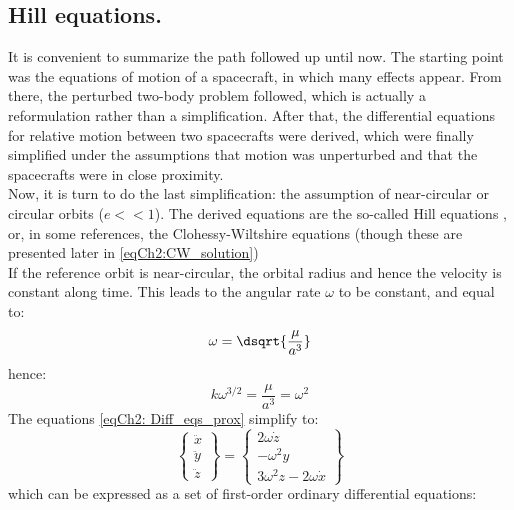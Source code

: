 	\subsection{Hill equations.}\label{secCh2:Hill_eqs}
	\indent It is convenient to summarize the path followed up until now. The starting point was the equations of motion of a spacecraft, in which many effects appear. From there, the perturbed two-body problem followed, which is actually a reformulation rather than a simplification. After that, the differential equations for relative motion between two spacecrafts were derived, which were finally simplified under the assumptions that motion was unperturbed and that the spacecrafts were in close proximity. \\
	\indent Now, it is turn to do the last simplification: the assumption of near-circular or circular orbits ($e<<1$). The derived equations are the so-called Hill equations \cite{Hill}, or, in some references, the Clohessy-Wiltshire equations (though these are presented later in \eqref{eqCh2:CW_solution})\\
	\indent If the reference orbit is near-circular, the orbital radius and hence the velocity is constant along time. This leads to the angular rate $\omega$ to be constant, and equal to:
	\[
	\omega = \dsqrt{\dfrac{\mu}{a^3}}
	\] 
	\noindent hence:
	\begin{equation}
	k \omega^{3/2} = \dfrac{\mu}{a^3} = \omega^2
	\label{eqCh2:omega_k}
	\end{equation}
	\indent The equations \eqref{eqCh2: Diff_eqs_prox} simplify to:\\
	\begin{equation}
	\left\{
	\begin{array}{c}
	\ddot{x}\\
	\ddot{y}\\
	\ddot{z}
	\end{array}\right\}
	= 
	\left\{
	\begin{array}{c}
	 2\omega \dot{z} \\
	-\omega^{2} y \\
	3\omega^{2} z - 2 \omega \dot{x} 
	\end{array}\right\}
	\label{eqCh2:Hill_eqs_V1}
	\end{equation}
	\noindent which can be expressed as a set of first-order ordinary differential equations:
